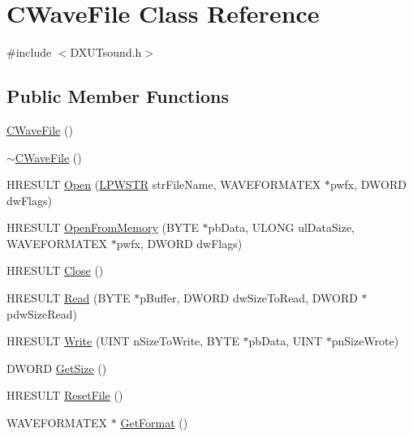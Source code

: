 \hypertarget{class_c_wave_file}{
\section{CWaveFile Class Reference}
\label{class_c_wave_file}
}


{\ttfamily \#include $<$DXUTsound.h$>$}\subsection*{Public Member Functions}
\begin{DoxyCompactItemize}
\item 
\hyperlink{class_c_wave_file_a4b7eb059e75249788ca628533fea295f}{CWaveFile} ()
\item 
\hyperlink{class_c_wave_file_aea59e99b66ec0c314cfcc239df26ca05}{$\sim$CWaveFile} ()
\item 
HRESULT \hyperlink{class_c_wave_file_a14ce677a0c459fd4f1798ff8c2d66005}{Open} (\hyperlink{_d_x_u_tgui_8cpp_a6ad64a19933213d15128e5fcd09bc1a6}{LPWSTR} strFileName, WAVEFORMATEX $\ast$pwfx, DWORD dwFlags)
\item 
HRESULT \hyperlink{class_c_wave_file_abf4405c91380ebd3377f1368b45d7cbb}{OpenFromMemory} (BYTE $\ast$pbData, ULONG ulDataSize, WAVEFORMATEX $\ast$pwfx, DWORD dwFlags)
\item 
HRESULT \hyperlink{class_c_wave_file_a8ff8d99701abd0e8b15972619e6ac951}{Close} ()
\item 
HRESULT \hyperlink{class_c_wave_file_a1eb28886c3d56d2ff278de51803cfe64}{Read} (BYTE $\ast$pBuffer, DWORD dwSizeToRead, DWORD $\ast$pdwSizeRead)
\item 
HRESULT \hyperlink{class_c_wave_file_a7c82ff281e7c3378b5a8f08c3561e537}{Write} (UINT nSizeToWrite, BYTE $\ast$pbData, UINT $\ast$pnSizeWrote)
\item 
DWORD \hyperlink{class_c_wave_file_a230c359dba9e652c0468b42345176984}{GetSize} ()
\item 
HRESULT \hyperlink{class_c_wave_file_ae6791a066f89f5e147cc0f5d9f2dbdbc}{ResetFile} ()
\item 
WAVEFORMATEX $\ast$ \hyperlink{class_c_wave_file_adb0ec4bcfd6d91248dfe778275928559}{GetFormat} ()
\end{DoxyCompactItemize}
